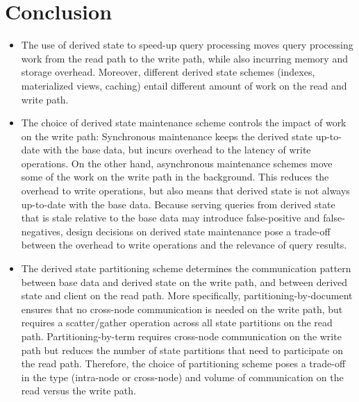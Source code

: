 \section{Conclusion}


\begin{itemize}
  \item The use of derived state to speed-up query processing moves query processing work from the read path to the write
  path, while also incurring memory and storage overhead.
  Moreover, different derived state schemes (indexes, materialized views, caching) entail different amount of work
  on the read and write path.

  \item The choice of derived state maintenance scheme controls the impact of work on the write path:
  Synchronous maintenance keeps the derived state up-to-date with the base data,
  but incurs overhead to the latency of write operations.
  On the other hand, asynchronous maintenance schemes move some of the work on the write path in the background.
  This reduces the overhead to write operations, but also means that derived state is not always up-to-date with the base
  data.
  Because serving queries from derived state that is stale relative to the base data may introduce false-positive and
  false-negatives,
  design decisions on derived state maintenance pose a trade-off between the overhead to write operations
  and the relevance of query results.

  \item The derived state partitioning scheme determines the communication pattern between base data and derived state
  on the write path, and between derived state and client on the read path.
  More specifically, partitioning-by-document ensures that no cross-node communication is needed on the write path,
  but requires a scatter/gather operation across all state partitions on the read path.
  Partitioning-by-term requires cross-node communication on the write path but reduces the number of state partitions
  that need to participate on the read path.
  Therefore, the choice of partitioning scheme poses a trade-off in the type (intra-node or cross-node) and volume
  of communication on the read versus the write path.


\end{itemize}
